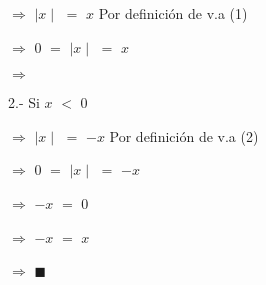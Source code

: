 \documentclass[12pt]{article}
\renewcommand{\qedsymbol}{$\blacksquare$}
\begin{document}
\hspace{1.4cm} $\Longrightarrow$ $\mid x \mid$ $=$ $x$ \hspace{0.3cm} {\textcolor{carrotorange}{Por definición de v.a (1)}} \vspace{0.5cm}

\hspace{1.4cm} $\Longrightarrow$ $0$ $=$  $\mid x \mid$ $=$ $x$ \vspace{0.5cm}

\hspace{1.4cm} $\Longrightarrow$ {\textcolor{vividviolet}{{}}} \vspace{0.5cm}

{\textcolor{yellow(munsell)}{2.-}} {\textcolor{palatinateblue}{ Si}} $x$ $<$ $0$ \vspace{0.5cm}

\hspace{1.4cm} $\Longrightarrow$ $\mid x \mid$ $=$ $-x$ \vspace{0.5cm} \hspace{0.3cm}  {\textcolor{carrotorange}{Por definición de v.a (2)}}

\hspace{1.4cm} $\Longrightarrow$ $0$ $=$  $\mid x \mid$ $=$ $-x$ \vspace{0.5cm}

\hspace{1.4cm} $\Longrightarrow$ $-x$ $=$  $0$ \vspace{0.5cm}

\hspace{1.4cm} $\Longrightarrow$ $-x$ $=$  $x$ \vspace{0.5cm}

\hspace{1.4cm} $\Longrightarrow$ {\textcolor{vividviolet}{{}}} \hspace{0.4cm} {\textcolor{carrotorange}{\qedsymbol}} \vspace{0.5cm}
\end{document}
